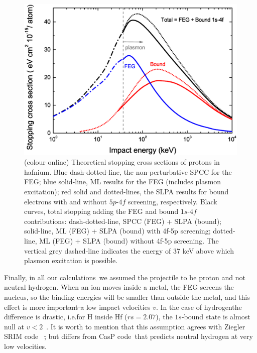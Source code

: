 \documentclass[aps,pra,reprint,superscriptaddress]{revtex4-1}
\providecommand{\DIFadd}[1]{{\protect\color{blue}\uwave{#1}}} %
\providecommand{\DIFdel}[1]{{\protect\color{red}\sout{#1}}}                      %
\providecommand{\DIFaddbegin}{} %
\providecommand{\DIFaddend}{} %
\providecommand{\DIFdelbegin}{} %
\providecommand{\DIFdelend}{} %
\newcommand{\DIFscaledelfig}{0.5}
\newlength{\DIFdelgraphicswidth} %
\newlength{\DIFdelgraphicsheight} %
\newcommand{\DIFaddincludegraphics}[2][]{{\color{blue}\fbox{\DIFOincludegraphics[#1]{#2}}}} %
\newcommand{\DIFdelincludegraphics}[2][]{%
\sbox{\DIFdelgraphicsbox}{\DIFOincludegraphics[#1]{#2}}%
\settoboxwidth{\DIFdelgraphicswidth}{\DIFdelgraphicsbox} %
\settoboxtotalheight{\DIFdelgraphicsheight}{\DIFdelgraphicsbox} %
\scalebox{\DIFscaledelfig}{%
\parbox[b]{\DIFdelgraphicswidth}{\usebox{\DIFdelgraphicsbox}\\[-\baselineskip] \rule{\DIFdelgraphicswidth}{0em}}\llap{\resizebox{\DIFdelgraphicswidth}{\DIFdelgraphicsheight}{%
\setlength{\unitlength}{\DIFdelgraphicswidth}%
\begin{picture}(1,1)%
\thicklines\linethickness{2pt} %
{\color[rgb]{1,0,0}\put(0,0){\framebox(1,1){}}}%
{\color[rgb]{1,0,0}\put(0,0){\line( 1,1){1}}}%
{\color[rgb]{1,0,0}\put(0,1){\line(1,-1){1}}}%
\end{picture}%
}\hspace*{3pt}}} %
} %
\DeclareRobustCommand{\DIFaddbegin}{\DIFOaddbegin \let\includegraphics\DIFaddincludegraphics} %
\DeclareRobustCommand{\DIFaddend}{\DIFOaddend \let\includegraphics\DIFOincludegraphics} %
\DeclareRobustCommand{\DIFdelbegin}{\DIFOdelbegin \let\includegraphics\DIFdelincludegraphics} %
\DeclareRobustCommand{\DIFdelend}{\DIFOaddend \let\includegraphics\DIFOincludegraphics} %
\begin{document}
\begin{figure}[!t]
\centering
\includegraphics[width=13.cm]{Fig02_new3.eps}
\caption{(colour online) Theoretical stopping cross sections of protons 
in hafnium. 
Blue dash-dotted-line, the non-perturbative SPCC for the FEG; 
blue solid-line, ML results for the FEG (includes plasmon excitation); 
red solid and dotted-lines, the SLPA results for bound electrons with 
and without $5p$-$4f$ screening, respectively. 
Black curves, total stopping adding the FEG and bound $1s$-$4f$ 
contributions: 
dash-dotted-line, SPCC (FEG) + SLPA (bound); 
solid-line, ML (FEG) + SLPA (bound) with 4f-5p screening; 
dotted-line, ML (FEG) + SLPA (bound) without 4f-5p screening.
The vertical grey dashed-line indicates the energy of 37 keV
above which plasmon excitation is possible.} 
\label{slpa4f}
\end{figure}

Finally, in all our calculations~\cite{mon17}\DIFaddbegin \DIFadd{, }\DIFaddend we assumed the projectile 
to be proton and not neutral hydrogen. When an ion moves inside a metal, 
the FEG screens the nucleus, so the binding energies will be smaller 
than outside the metal, and this effect is more \DIFdelbegin \DIFdel{important a }\DIFdelend \DIFaddbegin \DIFadd{critical at }\DIFaddend low impact 
velocities $v$. In the case of hydrogen\DIFaddbegin \DIFadd{, }\DIFaddend the difference is drastic, 
i.e.\DIFaddbegin \DIFadd{, }\DIFaddend for H inside Hf ($rs=2.07$), the $1s$-bound state is almost null at 
$v<2$~\cite{suppression}. It is worth to mention that this assumption 
agrees with Ziegler SRIM code~\cite{Ziegler01} \DIFdelbegin \DIFdel{, }\DIFdelend but differs from CasP 
code~\cite{Grande}\DIFaddbegin \DIFadd{, }\DIFaddend that predicts neutral hydrogen at very low velocities.
\end{document}
